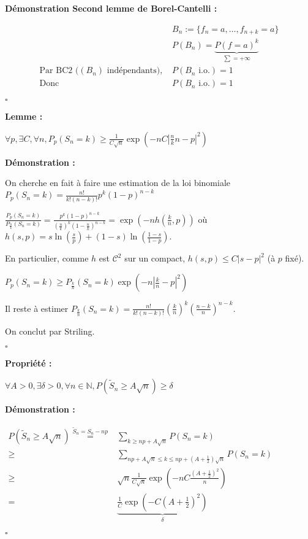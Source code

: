\documentclass[10pt,a4paper,notitlepage ]{report}
\newcommand{\N}{\mathbb N}
\newcounter{th}
\newenvironment{propriete}[1][]{
	\begin{tcolorbox}
		\textbf{Propriété #1 : }
}
{\end{tcolorbox}}
\newenvironment{demo}[1][]{

	\textbf{Démonstration #1 :}
}{\begin{flushright}
	$\square$
\end{flushright}
}
\newenvironment{lemme}[1][]{
	\begin{tcolorbox}
		\textbf{Lemme #1 : }
	}
	{\end{tcolorbox}}
\begin{document}
\begin{demo}[Second lemme de Borel-Cantelli]
	\begin{align*}
		&B_n := \{f_n=a, \dots, f_{n+k}=a\} \\
		&P(B_n) =\underset {\sum = +\infty} {\underbrace{P(f=a)^k}} \\
		\text{Par BC2 ($(B_n)$ indépendants), } &P(B_n \text{ i.o.}) = 1 \\
		\text{Donc } &P(B_n \text{ i.o.}) = 1
	\end{align*}
\end{demo}

\begin{lemme}
	$\forall p, \exists C, \forall n, P_p(S_n=k)\ge \frac 1 {C\sqrt n} \exp{\left( -nC\left| \frac nk n -p\right|^2 \right)}$
\end{lemme}

\begin{demo}
	On cherche en fait à faire une estimation de la loi binomiale $P_p(S_n=k) = \frac{n!}{k!(n-k)!} p^k (1-p)^{n-k}$
	
	$\frac{P_p(S_n=k)}{P_{\frac n k}(S_n=k)} = \frac{p^k(1-p)^{n-k}}{\left(\frac n k\right)^k \left(1- \frac n k\right)^{n-k}} = \exp{\left( -nh\left(\frac k n, p\right)\right)}$ où $h(s,p) = s\ln\left(\frac s p \right) +(1-s)\ln\left(\frac{1-s}{1-p}\right)$.
	
	En particulier, comme $h$ est $\mathcal C^2$ sur un compact, $h(s,p) \le C|s-p|^2$ (à $p$ fixé).
	
	$P_p(S_n=k) \ge P_{\frac k n}(S_n=k)\exp\left( -n \left| \frac k n -p\right|^2\right)$
	
	Il reste à estimer $P_{\frac k n}(S_n=k) = \frac{n!}{k!(n-k)!}\left(\frac k n\right)^k \left( \frac {n-k} n \right)^{n-k}$.
	
	On conclut par Striling.
\end{demo}

\begin{propriete}
	$\forall A > 0, \exists \delta > 0, \forall n\in\N, P(\tilde S_n \ge A\sqrt n) \ge \delta$
\end{propriete}

\begin{demo}
	
	$\begin{aligned}
	P(\tilde S_n \ge A\sqrt n) \overset {\tilde S_n = S_n - np} =& \underset{k\ge np + A\sqrt n} \sum P(S_n=k) \\
	\ge & \underset{np + A\sqrt n \le k \le np +(A+\frac 1 2) \sqrt n} \sum P(S_n=k) \\
	\ge & \sqrt n \frac 1 {C\sqrt n} \exp \left(-nC \frac {(A+\frac 1 2)^2} n \right) \\
	=& \underset{\delta} {\underbrace{\frac 1 C \exp\left( -C(A + \frac 1 2)^2 \right)}}
	\end{aligned}$
\end{demo}
\end{document}
